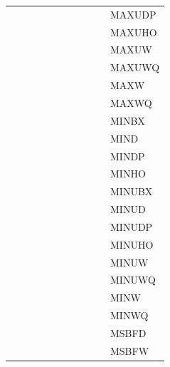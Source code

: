 {\begin{tabular}{|l|l|l|l|l|l|l|l|l|l|l|}
 & & & & & & & & & & \textsf{MAXUDP} \\
 & & & & & & & & & & \textsf{MAXUHO} \\
 & & & & & & & & & & \textsf{MAXUW} \\
 & & & & & & & & & & \textsf{MAXUWQ} \\
 & & & & & & & & & & \textsf{MAXW} \\
 & & & & & & & & & & \textsf{MAXWQ} \\
 & & & & & & & & & & \textsf{MINBX} \\
 & & & & & & & & & & \textsf{MIND} \\
 & & & & & & & & & & \textsf{MINDP} \\
 & & & & & & & & & & \textsf{MINHO} \\
 & & & & & & & & & & \textsf{MINUBX} \\
 & & & & & & & & & & \textsf{MINUD} \\
 & & & & & & & & & & \textsf{MINUDP} \\
 & & & & & & & & & & \textsf{MINUHO} \\
 & & & & & & & & & & \textsf{MINUW} \\
 & & & & & & & & & & \textsf{MINUWQ} \\
 & & & & & & & & & & \textsf{MINW} \\
 & & & & & & & & & & \textsf{MINWQ} \\
 & & & & & & & & & & \textsf{MSBFD} \\
 & & & & & & & & & & \textsf{MSBFW} \\
\hline\end{tabular}
}
\smallskip

